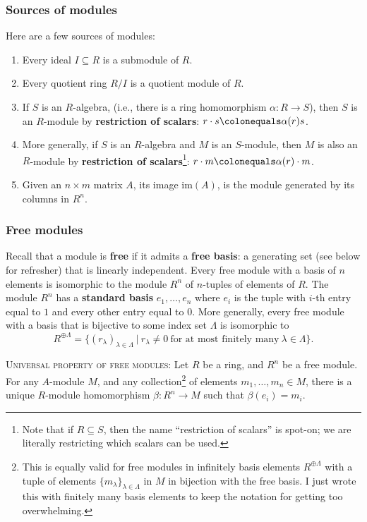 \documentclass[12pt]{amsart}
\newcommand{\0}{$\phantom{.}$}
\newcommand{\1}{\mathbbm{1}}
\newcommand\ceq{\colonequals}
\newcommand{\sssec}[1]{\subsubsection*{#1}}
\begin{document}
\vspace{-1.7mm}

\sssec{Sources of modules} Here are a few sources of modules:
\begin{enumerate}
\item Every ideal $I\subseteq R$ is a submodule of $R$.
\item Every quotient ring $R/I$ is a quotient module of $R$.
\item If $S$ is an $R$-algebra, (i.e., there is a ring homomorphism $\alpha: R\to S$), then $S$ is an $R$-module by \textbf{restriction of scalars}:
$r \cdot s \ceq \alpha(r) s$.
\item More generally, if $S$ is an $R$-algebra and $M$ is an $S$-module, then $M$ is also an $R$-module by \textbf{restriction of scalars}\footnote{Note that if $R\subseteq S$, then the name ``restriction of scalars''
is spot-on; we are literally restricting which scalars can be used.}: $r \cdot m \ceq \alpha(r) \cdot m$.
\item Given an $n\times m$ matrix $A$, its image $\mathrm{im}(A)$, is the module generated by its columns in $R^n$.
\end{enumerate}



\sssec{Free modules} Recall that a module is \textbf{free} if it admits a \textbf{free basis}: a generating set (see below for refresher) that is linearly independent. Every free module with a basis of $n$ elements is isomorphic to the module $R^n$ of $n$-tuples of elements of $R$. The module $R^n$ has a \textbf{standard basis} $e_1,\dots,e_n$ where $e_i$ is the tuple with $i$-th entry equal to $1$ and every other entry equal to $0$. More generally, every free module with a basis that is bijective to some index set $\Lambda$ is isomorphic to 
\[ R^{\oplus \Lambda} = \{ (r_\lambda)_{\lambda\in\Lambda} \ | \ r_\lambda\neq 0 \ \text{for at most finitely many} \ \lambda\in\Lambda\}.\]

\noindent \textsc{Universal property of free modules:} Let $R$ be a ring, and $R^n$ be a free module. For any \mbox{$A$-module} $M$, and any collection\footnote{This is equally valid for free modules in infinitely basis elements $R^{\oplus \Lambda}$ with a tuple of elements $\{m_\lambda\}_{\lambda\in \Lambda}$ in $M$ in bijection with the free basis. I just wrote this with finitely many basis elements to keep the notation for getting too overwhelming.}  of elements $m_1,\dots,m_n\in M$, there is a unique $R$-module homomorphism ${\beta: R^n\to M}$ such that $\beta(e_i)= m_i$.
\end{document}
